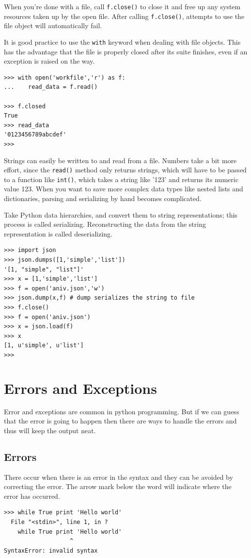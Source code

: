 \documentclass[12pt,a4paper]{article}
\begin{document}
When you’re done with a file, call \texttt{f.close()} to close it and free up any system resources taken up by the open file. After calling \texttt{f.close()}, attempts to use the file object will automatically fail. 

It is good practice to use the \texttt{with} keyword when dealing with file objects. This has the advantage that the file is properly closed after its suite finishes, even if an exception is raised on the way.

\begin{verbatim}
>>> with open('workfile','r') as f:
...    read_data = f.read()
	
>>> f.closed
True
>>> read_data
'0123456789abcdef'
>>> 
\end{verbatim}
Strings can easily be written to and read from a file. Numbers take a bit more effort, since the \texttt{read()} method only returns strings, which will have to be passed to a function like \texttt{int()}, which takes a string like '123' and returns its numeric value 123. When you want to save more complex data types like nested lists and dictionaries, parsing and serializing by hand becomes complicated.

Take Python data hierarchies, and convert them to string representations; this process is called serializing. Reconstructing the data from the string representation is called deserializing. 
\begin{verbatim}
>>> import json
>>> json.dumps([1,'simple','list'])
'[1, "simple", "list"]'
>>> x = [1,'simple','list']
>>> f = open('aniv.json','w')
>>> json.dump(x,f) # dump serializes the string to file 
>>> f.close()
>>> f = open('aniv.json')
>>> x = json.load(f)
>>> x
[1, u'simple', u'list']
>>> 
\end{verbatim}

\section{Errors and Exceptions}
Error and exceptions are common in python programming. But if we can guess that the error is going to happen then there are ways to handle the errors and thus will keep the output neat.
\subsection{Errors}
There occur when there is an error in the syntax and they can be avoided by correcting the error. The arrow mark below the word will indicate where the error has occurred.
\begin{verbatim}
>>> while True print 'Hello world'
  File "<stdin>", line 1, in ?
    while True print 'Hello world'
                   ^
SyntaxError: invalid syntax
\end{verbatim}
\end{document}
